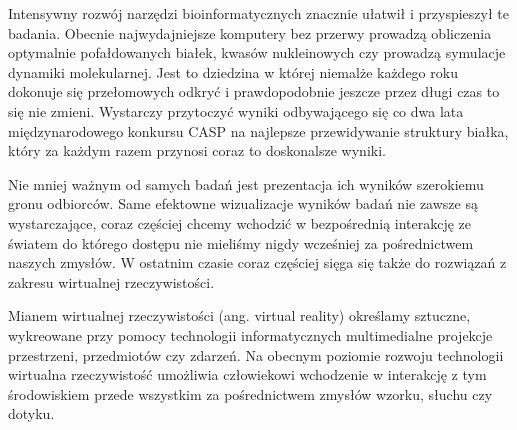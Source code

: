 \documentclass[licencjacka]{pracamgr}
\begin{document}
Intensywny rozwój narzędzi bioinformatycznych znacznie ułatwił i przyspieszył te badania. Obecnie najwydajniejsze komputery bez przerwy prowadzą obliczenia optymalnie pofałdowanych białek, kwasów nukleinowych czy prowadzą symulacje dynamiki molekularnej. Jest to dziedzina w której niemalże każdego roku dokonuje się przełomowych odkryć i prawdopodobnie jeszcze przez długi czas to się nie zmieni. Wystarczy przytoczyć wyniki odbywającego się co dwa lata międzynarodowego konkursu CASP na najlepsze przewidywanie struktury białka, który za każdym razem przynosi coraz to doskonalsze wyniki. 

Nie mniej ważnym od samych badań jest prezentacja ich wyników szerokiemu gronu odbiorców. Same efektowne wizualizacje wyników badań nie zawsze są wystarczające, coraz częściej chcemy wchodzić w bezpośrednią interakcję ze światem do którego dostępu nie mieliśmy nigdy wcześniej za pośrednictwem naszych zmysłów. W ostatnim czasie coraz częściej sięga się także do rozwiązań z zakresu wirtualnej rzeczywistości. 

Mianem wirtualnej rzeczywistości (ang. virtual reality) określamy sztuczne, wykreowane przy pomocy technologii informatycznych multimedialne projekcje przestrzeni, przedmiotów czy zdarzeń. Na obecnym poziomie rozwoju technologii wirtualna rzeczywistość umożliwia człowiekowi wchodzenie w interakcję z tym środowiskiem przede wszystkim za pośrednictwem zmysłów wzorku, słuchu czy dotyku. 
\end{document}
